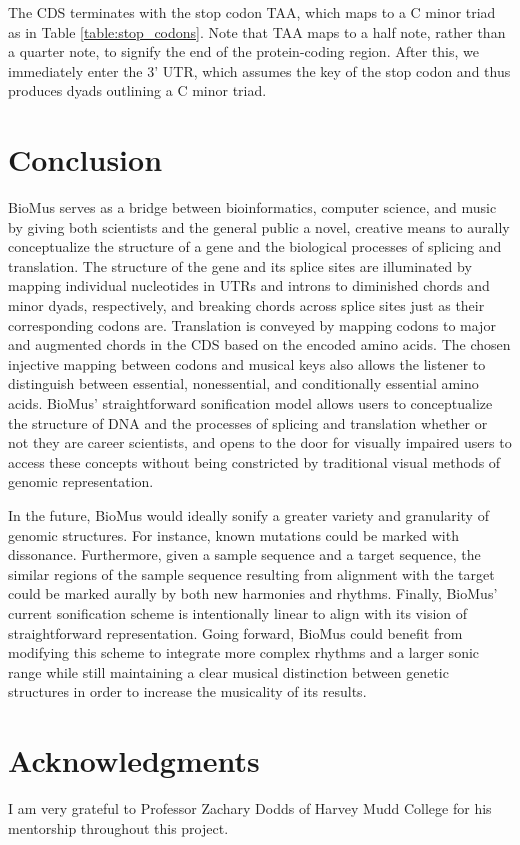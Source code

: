 \documentclass[letterpaper]{article}
\begin{document}
The CDS terminates with the stop codon TAA, which maps to a C minor triad as in Table \ref{table:stop_codons}. Note that TAA maps to a half note, rather than a quarter note, to signify the end of the protein-coding region. After this, we immediately enter the 3’ UTR, which assumes the key of the stop codon and thus produces dyads outlining a C minor triad.

\section{Conclusion}
BioMus serves as a bridge between bioinformatics, computer science, and music by giving both scientists and the general public a novel, creative means to aurally conceptualize the structure of a gene and the biological processes of splicing and translation.   The structure of the gene and its splice sites are illuminated by mapping individual nucleotides in UTRs and introns to diminished chords and minor dyads, respectively, and breaking chords across splice sites just as their corresponding codons are. Translation is conveyed by mapping codons to major and augmented chords in the CDS based on the encoded amino acids. The chosen injective mapping between codons and musical keys also allows the listener to distinguish between essential, nonessential, and conditionally essential amino acids. BioMus’ straightforward sonification model allows users to conceptualize the structure of DNA and the processes of splicing and translation whether or not they are career scientists, and opens to the door for visually impaired users to access these concepts without being constricted by traditional visual methods of genomic representation.

In the future, BioMus would ideally sonify a greater variety and granularity of genomic structures. For instance, known mutations could be marked with dissonance. Furthermore, given a sample sequence and a target sequence, the similar regions of the sample sequence resulting from alignment with the target could be marked aurally by both new harmonies and rhythms. Finally, BioMus’ current sonification scheme is intentionally linear to align with its vision of straightforward representation. Going forward, BioMus could benefit from modifying this scheme to integrate more complex rhythms and a larger sonic range while still maintaining a clear musical distinction between genetic structures in order to increase the musicality of its results.


\section{Acknowledgments}

I am very grateful to Professor Zachary Dodds of Harvey Mudd College for his mentorship throughout this project.




\end{document}
